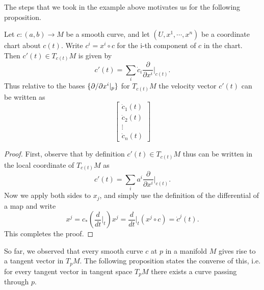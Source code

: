 The steps that we took in the example above motivates us for the following proposition.
\begin{proposition}
	\label{prop:VelocityVectorInLocalCorodinate}
	Let $ c:(a,b)\to M $ be a smooth curve, and let $ (U,x^1,\cdots,x^n) $ be a coordinate chart about $ c(t) $. Write $ c^i = x^i\circ c $ for the i-th component of $ c $ in the chart. Then $ c'(t) \in T_{c(t)}M $ is given by
	\[ c'(t) = \sum_i \dot{c}_i \frac{\partial}{\partial x^i}\big|_{c(t)}. \] 
	Thus relative to the bases $ \{\partial /\partial x^i|_p\} $ for $ T_{c(t)}M $ the velocity vector $ c'(t) $ can be written as
	\[ \begin{bmatrix}
		\dot{c}_1(t) \\
		\dot{c}_2(t) \\
		\vdots \\
		\dot{c}_n(t)
	\end{bmatrix} \]
\end{proposition}
\begin{proof}
	First, observe that by definition $ c'(t) \in T_{c(t)}M  $ thus can be written in the local coordinate  of $ T_{c(t)}M $ as
	\[ c'(t) = \sum_i a^i \frac{\partial}{\partial x^i}\big|_{c(t)}. \]
	Now we apply both sides to $ x_j $, and simply use the definition of the differential of a map and write
	\[x^j = c_*(\frac{d}{dt}\big|_{t}) x^j  =  \frac{d}{dt}\big|_{t}(x^j\circ c) = \dot{c}^j(t). \]
	This completes the proof.
\end{proof}

So far, we observed that every smooth curve $ c $ at $ p $ in a manifold $ M $ gives rise to a tangent vector in $ T_pM $. The following proposition states the converse of this, i.e. for every tangent vector in tangent space $ T_pM $ there exists a curve passing through $ p $.

